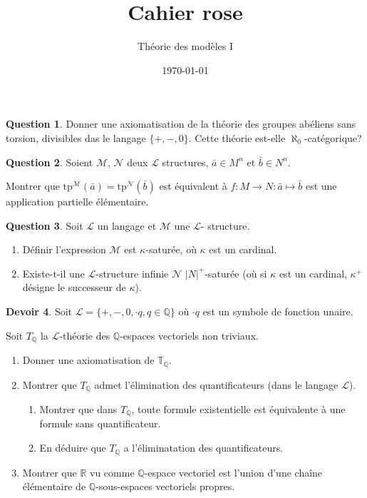 \documentclass[a4paper, 12pt]{article}
\title{Cahier rose}
\author{Théorie des modèles I}
\date{\today}
\theoremstyle{definition} \newtheorem{quest}{Question}
\theoremstyle{definition} \newtheorem{dev}[quest]{Devoir}
\newcommand{\tp}[2]{\mathrm{tp}^{\mathscr{#1}}\left(#2\right)}
\begin{document}
\maketitle

\begin{quest}
  Donner une axiomatisation de la théorie des groupes abéliens
  sans torsion, divisibles das le langage $\{+, -, 0\}$. Cette
  théorie est-elle $\aleph_0$-catégorique?
\end{quest}

\begin{quest}
  Soient $\mathscr M$, $\mathscr N$ deux $\mathscr L$ structures,
  $\bar{a}\in M^n$ et $\bar{b}\in N^n$.

  Montrer que $\tp{M}{\bar{a}} = \tp{N}{\bar{b}}$ est équivalent
  à $f: M\to N: \bar{a}\mapsto \bar{b}$ est une application
  partielle élémentaire.
\end{quest}

\begin{quest}
  Soit $\mathscr{L}$ un langage et $\mathscr{M}$ une $\mathscr L$-%
  structure.
  \begin{enumerate}
  \item Définir l'expression \og $\mathscr M$ est $\kappa$-saturée,
    où $\kappa$ est un cardinal.
  \item Existe-t-il une $\mathscr L$-structure infinie $\mathscr N$
    $|N|^+$-saturée (où si $\kappa$ est un cardinal, $\kappa^+$ désigne
    le successeur de $\kappa$).
  \end{enumerate}
\end{quest}

\begin{dev}
  Soit $\mathscr L = \{ +, -, 0, \cdot q, q\in\mathbb Q\}$ où
  $\cdot q$ est un symbole de fonction unaire.

  Soit $T_{\mathbb Q}$ la $\mathscr L$-théorie des $\mathbb Q$-espaces
  vectoriels non triviaux.
  \begin{enumerate}
  \item Donner une axiomatisation de $\mathbb T_{\mathbb Q}$.
  \item Montrer que $T_{\mathbb Q}$ admet l'élimination
    des quantificateurs (dans le langage $\mathscr L$).
    \begin{enumerate}
    \item Montrer que dans $T_{\mathbb Q}$, toute formule
      existentielle est équivalente à une formule sans quantificateur.
    \item En déduire que $T_{\mathbb Q}$ a l'éliminatation
      des quantificateurs.
    \end{enumerate}
  \item Montrer que $\mathbb R$ vu comme $\mathbb Q$-espace
    vectoriel est l'union d'une chaîne élémentaire de
    $\mathbb Q$-sous-espaces vectoriels propres.
  \end{enumerate}
\end{dev}
\end{document}
